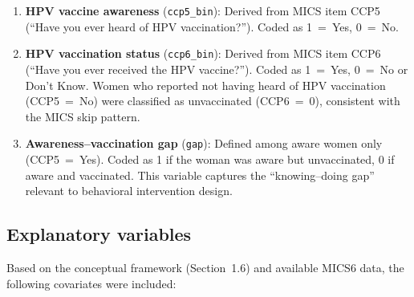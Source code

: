 \begin{enumerate}
	\item \textbf{HPV vaccine awareness} (\texttt{ccp5\_bin}): Derived from MICS item CCP5 (``Have you ever heard of HPV vaccination?''). Coded as 1~=~Yes, 0~=~No.
	
	\item \textbf{HPV vaccination status} (\texttt{ccp6\_bin}): Derived from MICS item CCP6 (``Have you ever received the HPV vaccine?''). Coded as 1~=~Yes, 0~=~No or Don't Know. Women who reported not having heard of HPV vaccination (CCP5~=~No) were classified as unvaccinated (CCP6~=~0), consistent with the MICS skip pattern.
	
	\item \textbf{Awareness--vaccination gap} (\texttt{gap}): Defined among aware women only (CCP5~=~Yes). Coded as 1 if the woman was aware but unvaccinated, 0 if aware and vaccinated. This variable captures the ``knowing--doing gap'' relevant to behavioral intervention design.
\end{enumerate}

\subsection{Explanatory variables}

Based on the conceptual framework (Section~1.6) and available MICS6 data, the following covariates were included:

